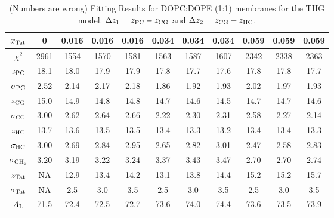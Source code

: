 \begin{table}[htbp]
  \centering
  \begin{tabular}{c c c c c c c c c c c}
    \hline
    $x_\textrm{Tat}$ & 0 & 0.016 & 0.016 & 0.016 & 0.034 & 0.034 & 0.034 & 0.059 & 0.059 & 0.059 \\
    \hline
    $\chi^2$ & 2961 & 1554 & 1570 & 1581 & 1563 & 1587 & 1607 & 2342 & 2338 & 2363 \\     
    $z_\textrm{PC}$ & 18.1 & 18.0 & 17.9 & 17.9 & 17.8 & 17.7 & 17.6 & 17.8 & 17.8 & 17.7 \\
    $\sigma_\textrm{PC}$ & 2.52 & 2.14 & 2.17 & 2.18 & 1.86 & 1.92 & 1.93 & 2.02 & 1.97 & 1.93 \\
    $z_\textrm{CG}$ & 15.0 & 14.9 & 14.8 & 14.8 & 14.7 & 14.6 & 14.5 & 14.7 & 14.7 & 14.6 \\
    $\sigma_\textrm{CG}$ & 3.00 & 2.62 & 2.64 & 2.66 & 2.22 & 2.30 & 2.31 & 2.58 & 2.27 & 2.14 \\
    $z_\textrm{HC}$ & 13.7 & 13.6 & 13.5 & 13.5 & 13.4 & 13.3 & 13.2 & 13.4 & 13.4 & 13.3 \\ 
    $\sigma_\textrm{HC}$ & 3.00 & 2.69 & 2.84 & 2.95 & 2.65 & 2.82 & 3.01 & 2.47 & 2.58 & 2.83 \\
    $\sigma_{\textrm{CH}_3}$ & 3.20 & 3.19 & 3.22 & 3.24 & 3.37 & 3.43 & 3.47 & 2.70 & 2.70 & 2.74 \\
    $z_\textrm{Tat}$ & NA & 12.9 & 13.4 & 14.2 & 13.1 & 13.8 & 14.4 & 15.2 & 15.2 & 15.7 \\
    $\sigma_\textrm{Tat}$ & NA & 2.5 & 3.0 & 3.5 & 2.5 & 3.0 & 3.5 & 2.5 & 3.0 & 3.5 \\ 
    $A_\textrm{L}$ & 71.5 & 72.4 & 72.5 & 72.7 & 73.6 & 74.0 & 74.4 & 73.6 & 73.5 & 73.9 \\
    \hline
  \end{tabular}
  \caption{(Numbers are wrong) Fitting Results for DOPC:DOPE (1:1) membranes for the THG model. $\Delta z_1 = z_\textrm{PC}-z_\textrm{CG}$
  and $\Delta z_2 = z_\textrm{CG}-z_\textrm{HC}$.}
  \label{tb:DOPCDOPE1to1_fit_results}
\end{table}

